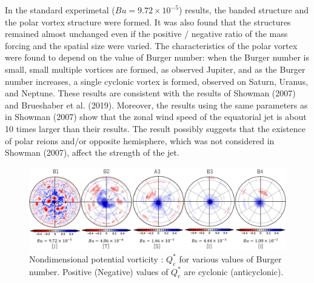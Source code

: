 \documentclass[a4j,8pt]{jarticle}
\begin{document}
In the standard experimetal ($Bu = 9.72\times 10^{-5}$) results,
the banded structure and
the polar vortex structure were formed.
%
It was also found that the structures remained almost unchanged
even if the positive / negative
ratio of the mass forcing and the spatial size were varied.
%
The characteristics of the polar vortex were
found to depend on the value of Burger number:
when the Burger number is small,
small multiple vortices are formed, as observed Jupiter,
and as the Burger number increases,
a single cyclonic vortex is formed, observed on Saturn, Uranus, and Neptune.
%
These results are consistent with the results of Showman (2007) and Brueshaber et al. (2019).
%
Moreover, the results using the same parameters as in Showman (2007) show that
the zonal wind speed of the equatorial jet is
about 10 times larger than their results.
%
The result possibly suggests that the existence of polar reions and/or opposite hemisphere,
which was not considered in Showman (2007), affect the strength of the jet.
%
\begin{figure}[b]
  \begin{center}
  \includegraphics[width=12cm]{./fig/case1_nonqv_a.png}
  \caption{\footnotesize{Nondimensional potential vorticity : $Q_e^*$ for various values of Burger number.
Positive (Negative) values of $Q_e^*$ are cyclonic (anticyclonic).
}}
  \label{case1:nonqv_a}
  \end{center}
\end{figure}
%
%
\end{document}
